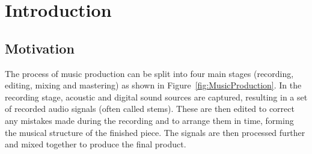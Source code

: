 \chapter{Introduction}
\label{chap:Introduction}

\section{Motivation}
\label{sec:Introduction-Motivation}
	The process of music production can be split into four main stages (recording, editing, mixing and mastering) as
	shown in Figure~\ref{fig:MusicProduction}. In the recording stage, acoustic and digital sound sources are captured,
	resulting in a set of recorded audio signals (often called stems). These are then edited to correct any mistakes
	made during the recording and to arrange them in time, forming the musical structure of the finished piece. The
	signals are then processed further and mixed together to produce the final product.

